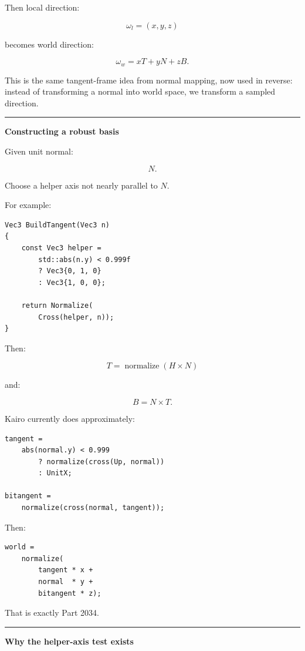 Then local direction:

\[
\omega_l=(x,y,z)
\]

becomes world direction:

\[
\boxed{
\omega_w
=
xT+
yN+
zB.
}
\]

This is the same tangent-frame idea from normal mapping, now used in reverse: instead of transforming a normal into world space, we transform a sampled direction.

\begin{center}\rule{0.5\linewidth}{0.5pt}\end{center}

\textbf{Constructing a robust basis}

Given unit normal:

\[
N.
\]

Choose a helper axis not nearly parallel to \(N\).

For example:

\begin{verbatim}
Vec3 BuildTangent(Vec3 n)
{
    const Vec3 helper =
        std::abs(n.y) < 0.999f
        ? Vec3{0, 1, 0}
        : Vec3{1, 0, 0};

    return Normalize(
        Cross(helper, n));
}
\end{verbatim}

Then:

\[
T=\operatorname{normalize}(H\times N)
\]

and:

\[
B=N\times T.
\]

Kairo currently does approximately:

\begin{verbatim}
tangent =
    abs(normal.y) < 0.999
        ? normalize(cross(Up, normal))
        : UnitX;

bitangent =
    normalize(cross(normal, tangent));
\end{verbatim}

Then:

\begin{verbatim}
world =
    normalize(
        tangent * x +
        normal  * y +
        bitangent * z);
\end{verbatim}

That is exactly Part 2034.

\begin{center}\rule{0.5\linewidth}{0.5pt}\end{center}

\textbf{Why the helper-axis test exists}

